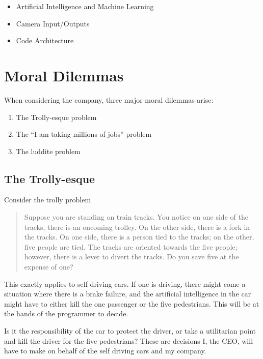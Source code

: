 \documentclass[12pt]{article}
\begin{document}
\begin{itemize}
    \item Artificial Intelligence and Machine Learning
    \item Camera Input/Outputs
    \item Code Architecture
\end{itemize}

\section{Moral Dilemmas}\label{component-2-moral-dilemmas}

When considering the company, three major moral dilemmas arise:

\begin{enumerate}
    \item The Trolly-esque problem
    \item The ``I am taking millions of jobs'' problem
    \item The luddite problem
\end{enumerate}

\subsection{The Trolly-esque}\label{the-trolly-esque}

Consider the trolly problem

\begin{quote}
    Suppose you are standing on train tracks. You notice on one side of the tracks, there is an oncoming trolley. On the other side, there is a fork in the tracks. On one side, there is a person tied to the tracks; on the other, five people are tied. The tracks are oriented towards the five people; however, there is a lever to divert the tracks. Do you save five at the expense of one?
\end{quote}

This exactly applies to self driving cars. If one is driving, there might come a situation where there is a brake failure, and the artificial intelligence in the car might have to either kill the one passenger or the five pedestrians. This will be at the hands of the programmer to decide.

Is it the responsibility of the car to protect the driver, or take a utilitarian point and kill the driver for the five pedestrians? These are decisions I, the CEO, will have to make on behalf of the self driving cars and my company.
\end{document}
